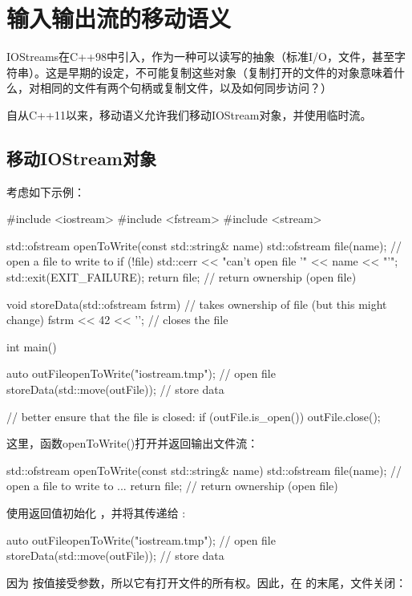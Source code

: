 \section{输入输出流的移动语义}
IOStreams在C++98中引入，作为一种可以读写的抽象（标准I/O，文件，甚至字符串）。这是早期的设定，不可能复制这些对象（复制打开的文件的对象意味着什么，对相同的文件有两个句柄或复制文件，以及如何同步访问？）

自从C++11以来，移动语义允许我们移动IOStream对象，并使用临时流。

\subsection{移动IOStream对象}

考虑如下示例：

\begin{cppcode}
#include <iostream>
#include <fstream>
#include <stream>

std::ofstream openToWrite(const std::string& name)
{
	std::ofstream file(name); // open a file to write to
	if (!file) {
		std::cerr << "can't open file '" << name << "'\n";
		std::exit(EXIT_FAILURE);
	}
	return file; // return ownership (open file)
}

void storeData(std::ofstream fstrm) // takes ownership of file (but this might change)
{
	fstrm << 42 << '\n';
} // closes the file

int main()
{
	auto outFile{openToWrite("iostream.tmp")}; // open file
	storeData(std::move(outFile)); // store data

	// better ensure that the file is closed:
	if (outFile.is_open()) {
		outFile.close();
	}
}
\end{cppcode}

这里，函数openToWrite()打开并返回输出文件流：

\begin{cppcode}
std::ofstream openToWrite(const std::string& name)
{
	std::ofstream file(name); // open a file to write to
	...
	return file; // return ownership (open file)
}
\end{cppcode}

使用返回值初始化 ，并将其传递给 :

\begin{cppcode}
auto outFile{openToWrite("iostream.tmp")}; // open file
storeData(std::move(outFile)); // store data
\end{cppcode}

因为  按值接受参数，所以它有打开文件的所有权。因此，在  的末尾，文件关闭：

